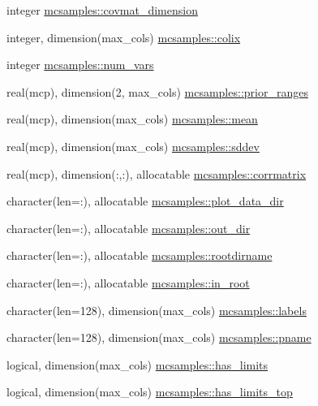 \begin{DoxyCompactItemize}
\item 
integer \mbox{\hyperlink{namespacemcsamples_aee5291f542c82e3b053eea9aa4a22eef}{mcsamples\+::covmat\+\_\+dimension}}
\item 
integer, dimension(max\+\_\+cols) \mbox{\hyperlink{namespacemcsamples_a16ed6273b18cc5caae328b4524db8061}{mcsamples\+::colix}}
\item 
integer \mbox{\hyperlink{namespacemcsamples_ad2594baa1bbb61af048a932e45cd4060}{mcsamples\+::num\+\_\+vars}}
\item 
real(mcp), dimension(2, max\+\_\+cols) \mbox{\hyperlink{namespacemcsamples_a0902678bdbc7aa6ef8b8992ce0a19c5e}{mcsamples\+::prior\+\_\+ranges}}
\item 
real(mcp), dimension(max\+\_\+cols) \mbox{\hyperlink{namespacemcsamples_a770892813dc80f66c4a9d4af5df91a26}{mcsamples\+::mean}}
\item 
real(mcp), dimension(max\+\_\+cols) \mbox{\hyperlink{namespacemcsamples_aacce77bfdf0523e8c96285821ce2a3f4}{mcsamples\+::sddev}}
\item 
real(mcp), dimension(\+:,\+:), allocatable \mbox{\hyperlink{namespacemcsamples_a6f7e8571ffd569f3c7538169829a9612}{mcsamples\+::corrmatrix}}
\item 
character(len=\+:), allocatable \mbox{\hyperlink{namespacemcsamples_a77ab102d98a4253b3213f06db7371cf9}{mcsamples\+::plot\+\_\+data\+\_\+dir}}
\item 
character(len=\+:), allocatable \mbox{\hyperlink{namespacemcsamples_a12247a941c9940691d984cd9596796bd}{mcsamples\+::out\+\_\+dir}}
\item 
character(len=\+:), allocatable \mbox{\hyperlink{namespacemcsamples_a578b65f55aa7a0d9598291d1cbd550db}{mcsamples\+::rootdirname}}
\item 
character(len=\+:), allocatable \mbox{\hyperlink{namespacemcsamples_a0f43faad2c6f83998962006e04268623}{mcsamples\+::in\+\_\+root}}
\item 
character(len=128), dimension(max\+\_\+cols) \mbox{\hyperlink{namespacemcsamples_abe3835988721f0cbcb6f7c28015e95f3}{mcsamples\+::labels}}
\item 
character(len=128), dimension(max\+\_\+cols) \mbox{\hyperlink{namespacemcsamples_ae27c34b7ef99d6a3d92c13e419fcceb1}{mcsamples\+::pname}}
\item 
logical, dimension(max\+\_\+cols) \mbox{\hyperlink{namespacemcsamples_ae802de51bb481b085361a661c090d461}{mcsamples\+::has\+\_\+limits}}
\item 
logical, dimension(max\+\_\+cols) \mbox{\hyperlink{namespacemcsamples_a948a6bc42d1b7b001f55aeaaf2d5b3f8}{mcsamples\+::has\+\_\+limits\+\_\+top}}

\end{DoxyCompactItemize}
